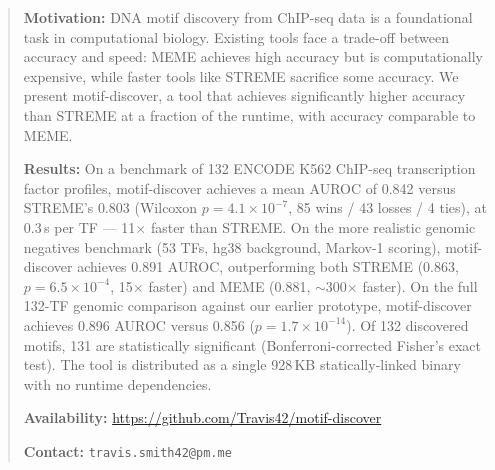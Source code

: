 \begin{abstract}
\noindent\textbf{Motivation:} DNA motif discovery from ChIP-seq data is a foundational task in computational biology. Existing tools face a trade-off between accuracy and speed: MEME achieves high accuracy but is computationally expensive, while faster tools like STREME sacrifice some accuracy. We present motif-discover, a tool that achieves significantly higher accuracy than STREME at a fraction of the runtime, with accuracy comparable to MEME.

\noindent\textbf{Results:} On a benchmark of 132 ENCODE K562 ChIP-seq transcription factor profiles, motif-discover achieves a mean AUROC of 0.842 versus STREME's 0.803 (Wilcoxon $p = 4.1 \times 10^{-7}$, 85 wins / 43 losses / 4 ties), at 0.3\,s per TF --- 11$\times$ faster than STREME. On the more realistic genomic negatives benchmark (53 TFs, hg38 background, Markov-1 scoring), motif-discover achieves 0.891 AUROC, outperforming both STREME (0.863, $p = 6.5 \times 10^{-4}$, 15$\times$ faster) and MEME (0.881, $\sim$300$\times$ faster). On the full 132-TF genomic comparison against our earlier prototype, motif-discover achieves 0.896 AUROC versus 0.856 ($p = 1.7 \times 10^{-14}$). Of 132 discovered motifs, 131 are statistically significant (Bonferroni-corrected Fisher's exact test). The tool is distributed as a single 928\,KB statically-linked binary with no runtime dependencies.

\noindent\textbf{Availability:} \url{https://github.com/Travis42/motif-discover}

\noindent\textbf{Contact:} \texttt{travis.smith42@pm.me}
\end{abstract}
